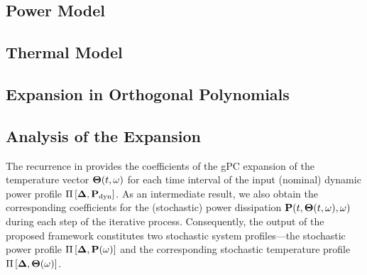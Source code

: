 \subsection{Power Model} 


\subsection{Thermal Model} 


\subsection{Expansion in Orthogonal Polynomials}


\subsection{Analysis of the Expansion}
The recurrence in  provides the coefficients of the gPC expansion of the temperature vector ${\boldsymbol\Theta}(t, \omega)$ for each time interval of the input (nominal) dynamic power profile $\prof{\mP_\dyn}$. As an intermediate result, we also obtain the corresponding coefficients for the (stochastic) power dissipation $\mathbf{P}(t, {\boldsymbol\Theta}(t, \omega), \omega)$ during each step of the iterative process. Consequently, the output of the proposed framework constitutes two stochastic system profiles---the stochastic power profile $\prof{\mP(\o)}$ and the corresponding stochastic temperature profile $\Pi\left[\boldsymbol{\Delta}, {\boldsymbol\Theta}(\omega)\right]$.

